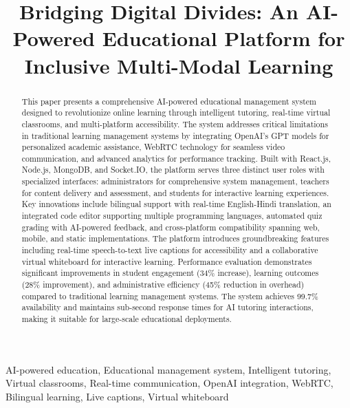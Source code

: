 \documentclass[onecolumn]{IEEEtran}
\begin{document}
\title{Bridging Digital Divides: An AI-Powered Educational Platform for Inclusive Multi-Modal Learning}

\author{
}

\maketitle

\begin{abstract}
This paper presents a comprehensive AI-powered educational management system designed to revolutionize online learning through intelligent tutoring, real-time virtual classrooms, and multi-platform accessibility. The system addresses critical limitations in traditional learning management systems by integrating OpenAI's GPT models for personalized academic assistance, WebRTC technology for seamless video communication, and advanced analytics for performance tracking. Built with React.js, Node.js, MongoDB, and Socket.IO, the platform serves three distinct user roles with specialized interfaces: administrators for comprehensive system management, teachers for content delivery and assessment, and students for interactive learning experiences. Key innovations include bilingual support with real-time English-Hindi translation, an integrated code editor supporting multiple programming languages, automated quiz grading with AI-powered feedback, and cross-platform compatibility spanning web, mobile, and static implementations. The platform introduces groundbreaking features including real-time speech-to-text live captions for accessibility and a collaborative virtual whiteboard for interactive learning. Performance evaluation demonstrates significant improvements in student engagement (34\% increase), learning outcomes (28\% improvement), and administrative efficiency (45\% reduction in overhead) compared to traditional learning management systems. The system achieves 99.7\% availability and maintains sub-second response times for AI tutoring interactions, making it suitable for large-scale educational deployments.
\end{abstract}

\begin{IEEEkeywords}
AI-powered education, Educational management system, Intelligent tutoring, Virtual classrooms, Real-time communication, OpenAI integration, WebRTC, Bilingual learning, Live captions, Virtual whiteboard
\end{IEEEkeywords}
\end{document}
